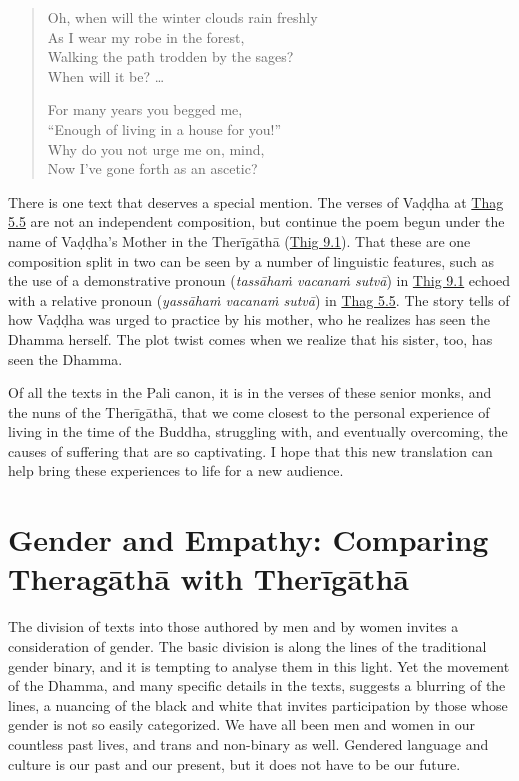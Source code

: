 \documentclass[12pt,openany]{book}%
\begin{document}
\begin{quotation}%
Oh, when will the winter clouds rain freshly \\
As I wear my robe in the forest, \\
Walking the path trodden by the sages? \\
When will it be? …

For many years you begged me, \\
“Enough of living in a house for you!” \\
Why do you not urge me on, mind, \\
Now I’ve gone forth as an ascetic?

%
\end{quotation}

There is one text that deserves a special mention. The verses of \textsanskrit{Vaḍḍha} at \href{https://suttacentral.net/thag5.5}{Thag 5.5} are not an independent composition, but continue the poem begun under the name of \textsanskrit{Vaḍḍha}’s Mother in the \textsanskrit{Therīgāthā} (\href{https://suttacentral.net/thig9.1/en/sujato}{Thig 9.1}). That these are one composition split in two can be seen by a number of linguistic features, such as the use of a demonstrative pronoun (\textit{\textsanskrit{tassāhaṁ} \textsanskrit{vacanaṁ} \textsanskrit{sutvā}}) in \href{https://suttacentral.net/thig9.1/en/sujato}{Thig 9.1} echoed with a relative pronoun (\textit{\textsanskrit{yassāhaṁ} \textsanskrit{vacanaṁ} \textsanskrit{sutvā}}) in \href{https://suttacentral.net/thag5.5}{Thag 5.5}. The story tells of how \textsanskrit{Vaḍḍha} was urged to practice by his mother, who he realizes has seen the Dhamma herself. The plot twist comes when we realize that his sister, too, has seen the Dhamma.

Of all the texts in the Pali canon, it is in the verses of these senior monks, and the nuns of the \textsanskrit{Therīgāthā}, that we come closest to the personal experience of living in the time of the Buddha, struggling with, and eventually overcoming, the causes of suffering that are so captivating. I hope that this new translation can help bring these experiences to life for a new audience.

\section*{Gender and Empathy: Comparing \textsanskrit{Theragāthā} with \textsanskrit{Therīgāthā}}

The division of texts into those authored by men and by women invites a consideration of gender. The basic division is along the lines of the traditional gender binary, and it is tempting to analyse them in this light. Yet the movement of the Dhamma, and many specific details in the texts, suggests a blurring of the lines, a nuancing of the black and white that invites participation by those whose gender is not so easily categorized. We have all been men and women in our countless past lives, and trans and non-binary as well. Gendered language and culture is our past and our present, but it does not have to be our future.
\end{document}
